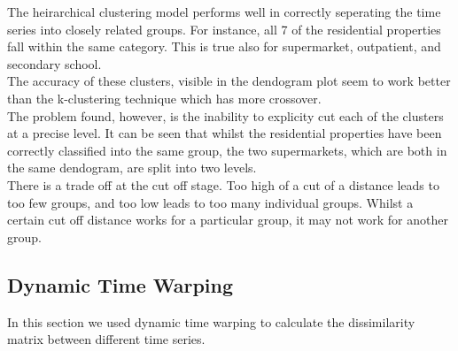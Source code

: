 \documentclass[12pt]{article}\usepackage[]{graphicx}\usepackage[]{color}
\begin{document}
The heirarchical clustering model performs well in correctly seperating the time series into closely related groups. For instance, all 7 of the residential properties fall within the same category. This is true also for supermarket, outpatient, and secondary school. \\

The accuracy of these clusters, visible in the dendogram plot seem to work better than the k-clustering technique which has more crossover.\\

The problem found, however, is the inability to explicity cut each of the clusters at a precise level. It can be seen that whilst the residential properties have been correctly classified into the same group, the two supermarkets, which are both in the same dendogram, are split into two levels. \\

There is a trade off at the cut off stage. Too high of a cut of a distance leads to too few groups, and too low leads to too many individual groups. Whilst a certain cut off distance works for a particular group, it may not work for another group.

\subsection{Dynamic Time Warping}

In this section we used dynamic time warping to calculate the dissimilarity matrix between different time series. \\
\end{document}
